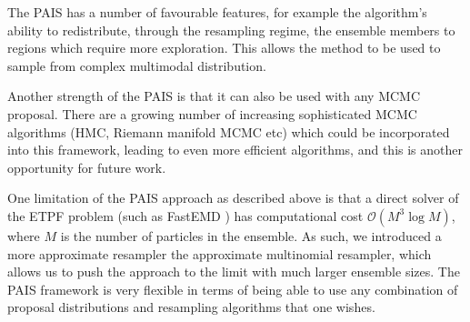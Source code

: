 \documentclass[final]{siamltex}
\begin{document}
The PAIS has a number of favourable features, for example the
algorithm's ability to redistribute, through the resampling regime,
the ensemble members to regions which require more exploration. This allows the
method to be used to sample from complex multimodal distribution.

Another strength of the PAIS is that it can also be used with any MCMC
proposal. There are a growing number of increasing sophisticated MCMC
algorithms (HMC, Riemann manifold MCMC etc) which could be
incorporated into this framework, leading to even more efficient
algorithms, and this is another opportunity for future work. 


One limitation of the PAIS approach as described above is that a
direct solver of the ETPF problem (such as FastEMD \cite{FastEMD}) has computational cost
$\mathcal{O}(M^3\log M)$, where $M$ is the number of particles in the
ensemble. As such, we introduced a more approximate resampler the
approximate multinomial resampler, which allows us to push the
approach to the limit
with much larger ensemble sizes. The PAIS framework is very flexible
in terms of being able to use any combination of proposal
distributions and resampling algorithms that one wishes.




\end{document}

